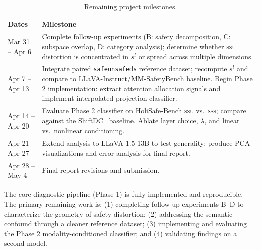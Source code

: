 \documentclass{article}
\newcommand{\safel}{s^l}
\begin{document}
\begin{table}[h]
  \centering
  \caption{Remaining project milestones.}
  \label{tab:timeline}
  \begin{tabular}{lp{9cm}}
    \toprule
    Dates & Milestone \\
    \midrule
    Mar 31 -- Apr 6
      & Complete follow-up experiments (B: safety decomposition, C: subspace overlap,
        D: category analysis); determine whether \textsc{ssu} distortion is
        concentrated in $\safel$ or spread across multiple dimensions. \\
    Apr 7 -- Apr 13
      & Integrate paired \texttt{safeunsafeds} reference dataset; recompute $\safel$ and
        compare to LLaVA-Instruct/MM-SafetyBench baseline.
        Begin Phase 2 implementation: extract attention allocation signals and
        implement interpolated projection classifier. \\
    Apr 14 -- Apr 20
      & Evaluate Phase 2 classifier on HoliSafe-Bench \textsc{ssu} vs.\ \textsc{sss};
        compare against the ShiftDC~\cite{zou2025shiftdc} baseline.
        Ablate layer choice, $\lambda$, and linear vs.\ nonlinear conditioning. \\
    Apr 21 -- Apr 27
      & Extend analysis to LLaVA-1.5-13B to test generality; produce PCA visualizations
        and error analysis for final report. \\
    Apr 28 -- May 4
      & Final report revisions and submission. \\
    \bottomrule
  \end{tabular}
\end{table}

The core diagnostic pipeline (Phase 1) is fully implemented and reproducible.
The primary remaining work is: (1) completing follow-up experiments B--D to characterize
the geometry of safety distortion; (2) addressing the semantic confound through a cleaner
reference dataset; (3) implementing and evaluating the Phase 2 modality-conditioned
classifier; and (4) validating findings on a second model.



\end{document}

